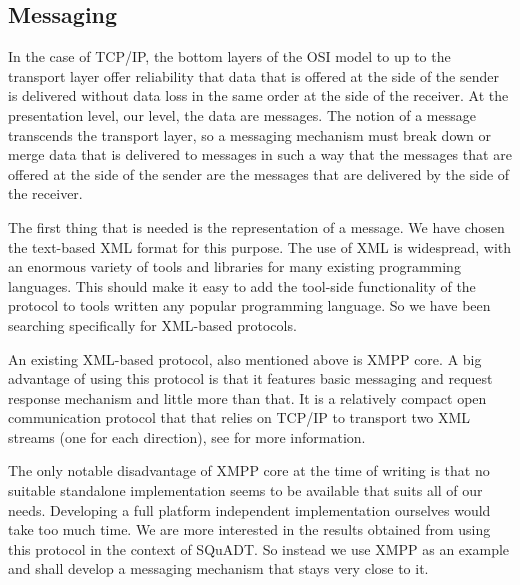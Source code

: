 \documentclass{article}
\newcommand{\squadt}{SQuADT\xspace}
\begin{document}
  \subsection{Messaging}

   In the case of TCP/IP, the bottom layers of the OSI model to up to the
   transport layer offer reliability that data that is offered at the side of
   the sender is delivered without data loss in the same order at the side of
   the receiver. At the presentation level, our level, the data are messages.
   The notion of a message transcends the transport layer, so a messaging
   mechanism must break down or merge data that is delivered to messages in
   such a way that the messages that are offered at the side of the sender are
   the messages that are delivered by the side of the receiver.
   
   The first thing that is needed is the representation of a message. We have
   chosen the text-based XML format for this purpose. The use of XML is
   widespread, with an enormous variety of tools and libraries for many
   existing programming languages. This should make it easy to add the
   tool-side functionality of the protocol to tools written any popular
   programming language. So we have been searching specifically for XML-based
   protocols. 
   
   An existing XML-based protocol, also mentioned above is XMPP core.  A big
   advantage of using this protocol is that it features basic messaging and
   request response mechanism and little more than that. It is a relatively
   compact open communication protocol that that relies on TCP/IP to transport
   two XML streams (one for each direction), see \cite{Sperberg-McQueen:06:EML}
   for more information.

   The only notable disadvantage of XMPP core at the time of writing is that no
   suitable standalone implementation seems to be available that suits all of
   our needs.  Developing a full platform independent implementation ourselves
   would take too much time. We are more interested in the results obtained
   from using this protocol in the context of \squadt. So instead we use XMPP as
   an example and shall develop a messaging mechanism that stays very close to it.

\end{document}

